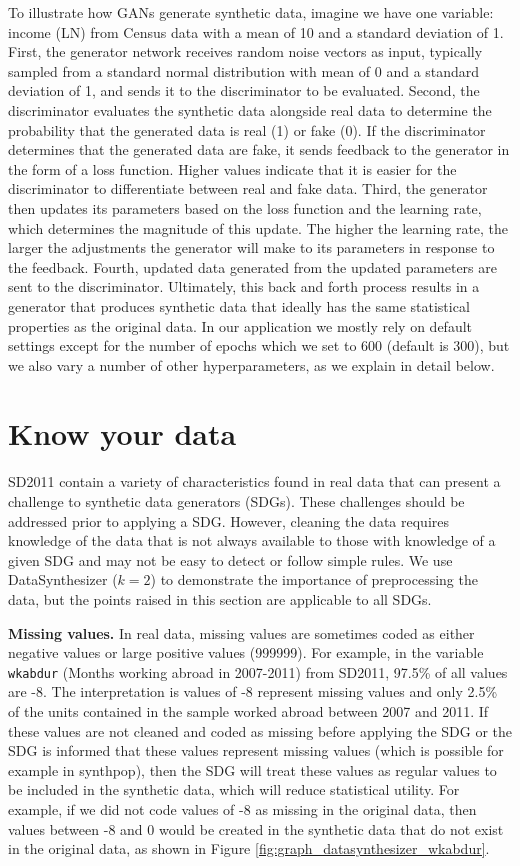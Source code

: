 \documentclass[runningheads]{llncs}
\begin{document}
To illustrate how GANs generate synthetic data, imagine we have one variable: income (LN) from Census data with a mean of 10 and a standard deviation of 1.  First, the generator network receives random noise vectors as input, typically sampled from a standard normal distribution with mean of 0 and a standard deviation of 1, and sends it to the discriminator to be evaluated.  Second, the discriminator evaluates the synthetic data alongside real data to determine the probability that the generated data is real (1) or fake (0).  If the discriminator determines that the generated data are fake, it sends feedback to the generator in the form of a loss function.  Higher values indicate that it is easier for the discriminator to differentiate between real and fake data.  Third, the generator then updates its parameters based on the loss function and the learning rate, which determines the magnitude of this update.  The higher the learning rate, the larger the adjustments the generator will make to its parameters in response to the feedback.  Fourth,  updated data generated from the updated parameters are sent to the discriminator.  Ultimately, this back and forth process results in a generator that produces synthetic data that ideally has the same statistical properties as the original data.  
In our application we mostly rely on default settings except for the number of epochs which we set to 600 (default is 300), but we also vary a number of other hyperparameters, as we explain in detail below.  

\section{Know your data}\label{sec:know_your_data}

SD2011 contain a variety of characteristics found in real data that can present a challenge to synthetic data generators (SDGs). These challenges should be addressed prior to applying a SDG.  However, cleaning the data requires knowledge of the data that is not always available to those with knowledge of a given SDG and may not be easy to detect or follow simple rules.  We use DataSynthesizer ($k=2$) to demonstrate the importance of preprocessing the data, but the points raised in this section are applicable to all SDGs.

{\bf Missing values.} In real data, missing values are sometimes coded as either negative values or large positive values (999999).  For example, in the variable \texttt{wkabdur} (Months working abroad in 2007-2011) from SD2011, 97.5\% of all values are -8.  The interpretation is values of -8 represent missing values and only 2.5\% of the units contained in the sample worked abroad between 2007 and 2011.  If these values are not cleaned and coded as missing before applying the SDG or the SDG is informed that these values represent missing values (which is possible for example in synthpop), then the SDG will treat these values as regular values to be included in the synthetic data, which will reduce statistical utility.  For example, if we did not code values of -8 as missing in the original data, then values between -8 and 0 would be created in the synthetic data that do not exist in the original data, as shown in Figure \ref{fig:graph_datasynthesizer_wkabdur}.  
\end{document}
